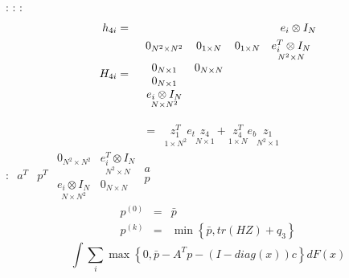 \documentclass{article}
\begin{document}
: : : 
\begin{eqnarray*}
h_{4i} &=&e_{i}\otimes I_{N} \\
H_{4i} &=&%
\begin{array}{cccc}
0_{N^{2}\times N^{2}} & 0_{1\times N} & 0_{1\times N} & \underset{%
N^{2}\times N}{e_{i}^{T}\otimes I_{N}} \\ 
0_{N\times 1} & 0_{N\times N} &  &  \\ 
0_{N\times 1} &  &  &  \\ 
\underset{N\times N^{2}}{e_{i}\otimes I_{N}} &  &  & 
\end{array}%
\end{eqnarray*}%
\begin{eqnarray*}
&& \\
&=&\underset{1\times N^{2}}{z_{1}^{T}}e_{t}\underset{N\times 1}{z_{4}}+%
\underset{1\times N}{z_{4}^{T}}e_{b}\underset{N^{2}\times 1}{z_{1}}
\end{eqnarray*}%
: $%
\begin{array}{cc}
a^{T} & p^{T}%
\end{array}%
\begin{array}{cc}
0_{N^{2}\times N^{2}} & \underset{N^{2}\times N}{e_{i}^{T}\otimes I_{N}} \\ 
\underset{N\times N^{2}}{e_{i}\otimes I_{N}} & 0_{N\times N}%
\end{array}%
\begin{array}{c}
a \\ 
p%
\end{array}%
$%
\begin{eqnarray*}
p^{\left( 0\right) } &=&\bar{p} \\
p^{\left( k\right) } &=&\min \left\{ \bar{p},tr\left( HZ\right)
+q_{3}\right\} 
\end{eqnarray*}%
\begin{equation*}
\int \sum_{i}\max \left\{ 0,\bar{p}-A^{T}p-\left( I-diag\left( x\right)
\right) c\right\} dF\left( x\right) 
\end{equation*}
\end{document}
